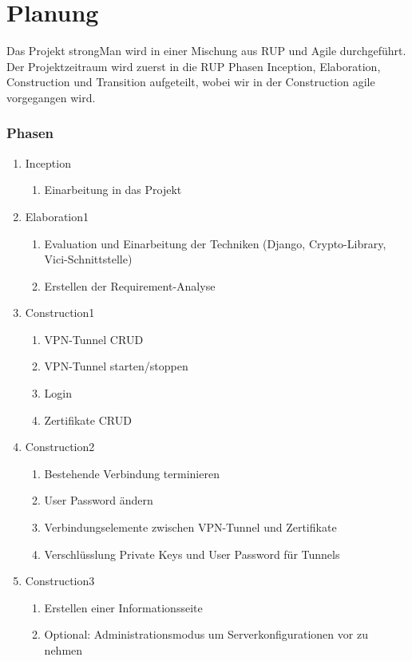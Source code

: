 \section{Planung}
Das Projekt strongMan wird in einer Mischung aus \Gls{RUP} und Agile durchgeführt. Der Projektzeitraum wird zuerst in die RUP Phasen Inception, Elaboration, Construction und Transition aufgeteilt, wobei wir in der Construction agile vorgegangen wird.

\subsubsection{Phasen}
\begin{enumerate}
  \item Inception
  \begin{enumerate}
    \item Einarbeitung in das Projekt
  \end{enumerate}
  \item Elaboration1
  \begin{enumerate}
    \item Evaluation und Einarbeitung der Techniken (Django, Crypto-Library, Vici-Schnittstelle)
    \item Erstellen der Requirement-Analyse
  \end{enumerate}
  \item Construction1
  \begin{enumerate}
    \item VPN-Tunnel CRUD
    \item VPN-Tunnel starten/stoppen
    \item Login 
    \item Zertifikate CRUD
  \end{enumerate}
  \item Construction2
  \begin{enumerate}
    \item Bestehende Verbindung terminieren
    \item User Password ändern 
    \item Verbindungselemente zwischen VPN-Tunnel und Zertifikate
    \item Verschlüsslung Private Keys und User Password für Tunnels
  \end{enumerate}
    \item Construction3
  \begin{enumerate}
  	\item Erstellen einer Informationsseite
    \item Optional: Administrationsmodus um Serverkonfigurationen vor zu nehmen

\end{enumerate}
\end{enumerate}
